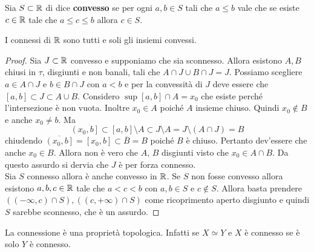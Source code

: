 \begin{definition}
	Sia $S \subset \mathbb{R}$ di dice \textbf{convesso} se per ogni $a, b\in S$ tali che $a \le b$ vale che se esiste $c\in \mathbb{R}$ tale che $a\le c\le b$ allora $c\in S$.
\end{definition} 

\begin{theorem}
	I connessi di $\mathbb{R}$ sono tutti e soli gli insiemi convessi. 
\end{theorem}
\begin{proof}
	Sia $J \subset \mathbb{R}$ convesso e supponiamo che sia sconnesso. Allora esistono $A, B$ chiusi in $\tau$, disgiunti e non banali, tali che $A \cap J \cup B \cap J = J$. Possiamo scegliere $a \in A \cap J$ e $b \in B \cap J$ con $a < b$ e per la convessità di $J$ deve essere che $\left[a,b\right] \subset J \subset A \cup B$. Considero $\sup \left[a,b\right] \cap A = x_0$ che esiste perché l'intersezione è non vuota. Inoltre $x_0 \in A$ poiché $A$ insieme chiuso. Quindi $x_0 \notin B$ e anche $x_0 \neq b$. Ma 
	\begin{equation*}
		\left(x_0, b\right] \subset \left[a,b\right] \setminus A \subset J \setminus A =  J \setminus (A \cap J) = B
	\end{equation*}
	chiudendo $\overline{\left(x_0, b\right]} = \left[x_0, b\right] \subset \overline{B} = B$ poiché $B$ è chiuso. Pertanto dev'essere che anche $x_0 \in B$. Allora non è vero che $A$, $B$ disgiunti visto che $x_0 \in A \cap B$. Da questo assurdo si dervia che $J$ è per forza connesso.\\
	
	Sia $S$ connesso allora è anche convesso in $\mathbb{R}$. Se $S$ non fosse convesso allora esistono $a,b,c \in \mathbb{R}$ tale che $a < c < b$ con $a,b \in S$ e $c \notin S$. Allora basta prendere $((-\infty, c) \cap S), ((c, +\infty) \cap S)$ come ricoprimento aperto disgiunto e quindi $S$ sarebbe sconnesso, che è un assurdo.
\end{proof}

\begin{remark}
	La connessione è una proprietà topologica. Infatti se $X \simeq Y$ e $X$ è connesso se è solo $Y$ è connesso. 
\end{remark} 

